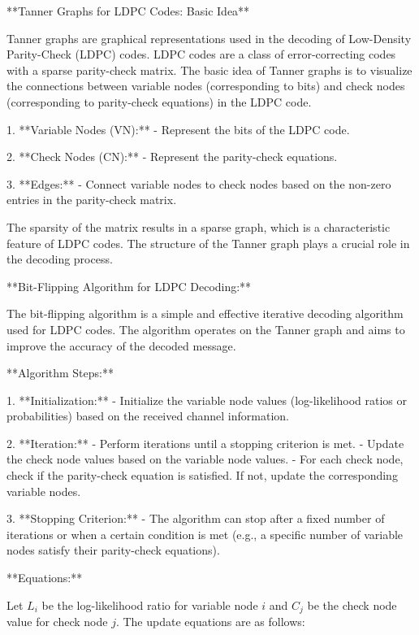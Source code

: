 \documentclass[colorlinks,11pt,a4paper,normalphoto,withhyper,ragged2e]{altareport}
\begin{document}
				**Tanner Graphs for LDPC Codes: Basic Idea**
				
				Tanner graphs are graphical representations used in the decoding of Low-Density Parity-Check (LDPC) codes. LDPC codes are a class of error-correcting codes with a sparse parity-check matrix. The basic idea of Tanner graphs is to visualize the connections between variable nodes (corresponding to bits) and check nodes (corresponding to parity-check equations) in the LDPC code.
				
				1. **Variable Nodes (VN):**
				- Represent the bits of the LDPC code.
				
				2. **Check Nodes (CN):**
				- Represent the parity-check equations.
				
				3. **Edges:**
				- Connect variable nodes to check nodes based on the non-zero entries in the parity-check matrix.
				
				The sparsity of the matrix results in a sparse graph, which is a characteristic feature of LDPC codes. The structure of the Tanner graph plays a crucial role in the decoding process.
				
				**Bit-Flipping Algorithm for LDPC Decoding:**
				
				The bit-flipping algorithm is a simple and effective iterative decoding algorithm used for LDPC codes. The algorithm operates on the Tanner graph and aims to improve the accuracy of the decoded message.
				
				**Algorithm Steps:**
				
				1. **Initialization:**
				- Initialize the variable node values (log-likelihood ratios or probabilities) based on the received channel information.
				
				2. **Iteration:**
				- Perform iterations until a stopping criterion is met.
				- Update the check node values based on the variable node values.
				- For each check node, check if the parity-check equation is satisfied. If not, update the corresponding variable nodes.
				
				3. **Stopping Criterion:**
				- The algorithm can stop after a fixed number of iterations or when a certain condition is met (e.g., a specific number of variable nodes satisfy their parity-check equations).
				
				**Equations:**
				
				Let \(L_{i}\) be the log-likelihood ratio for variable node \(i\) and \(C_{j}\) be the check node value for check node \(j\). The update equations are as follows:
				
\end{document}
